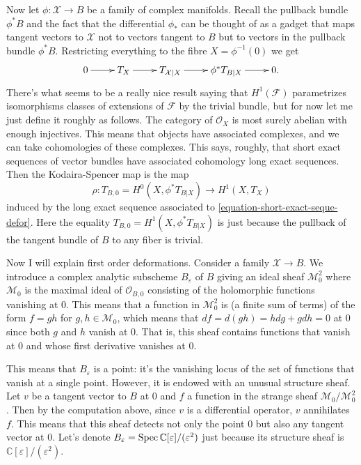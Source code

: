 Now let $\phi:\mathcal{X} \to B$ be a family
of complex manifolds.
Recall the pullback bundle $\phi^*B$ and the
fact
that the differential $\phi_*$ can be thought
of as a gadget
that maps tangent vectors to $\mathcal{X}$
not to vectors tangent to $B$ but
to vectors in the pullback bundle $\phi^*B$.
Restricting everything to the fibre
$X=\phi^{-1}(0)$ we get
\begin{equation}
\label{equation-short-exact-seque-defor}
\xymatrix{
0\ar[r]&T_X\ar[r]&T_{\mathcal{X}|X}\ar[r]&
\phi^*T_{B|X}\ar[r]&0.
}
\end{equation}
There's what seems to be a really nice result
saying that
$H^1(\mathcal{F})$ parametrizes isomorphisms
classes
of extensions of $\mathcal{F}$ by the trivial
bundle,
but for now let me just define it roughly as
follows.
The category of $\mathcal{O}_X$ is most
surely abelian
with enough injectives. This means that
objects
have associated complexes, and we can take
cohomologies of these complexes.
This says, roughly, that short exact
sequences of vector bundles have associated
cohomology
long exact sequences. Then the
Kodaira-Spencer map
is the map
$$
\rho:T_{B,0}=H^0(X,\phi^* T_{B|X})\to
H^1(X,T_X)
$$
induced by the long exact sequence associated
to
\ref{equation-short-exact-seque-defor}.
Here the equality $T_{B,0}=H^1(X,\phi^*
T_{B|X})$
is just because the pullback of the tangent
bundle of $B$
to any fiber is trivial.

\medskip\noindent
Now I will explain first order deformations.
Consider a family $\mathcal{X} \to B$.
We introduce a complex analytic subscheme
$B_\varepsilon$ of $B$
giving an ideal sheaf $\mathcal{M}^2_0$
where $\mathcal{M}_0$ is the maximal ideal
of $\mathcal{O}_{B,0}$ consisting of the
holomorphic
functions vanishing at 0.
This means that a function in
$\mathcal{M}^2_0$
is (a finite sum of terms) of the form $f=gh$
for $g,h \in \mathcal{M}_0$,
which means that $df=d(gh)=hdg+gdh=0$ at $0$
since both $g$ and $h$ vanish at $0$.
That is, this sheaf contains functions that
vanish
at $0$ and whose first derivative vanishes at
$0$.

This means that $B_\varepsilon$ is a point:
it's the vanishing locus of the set of
functions
that vanish at a single point.
However, it is endowed with an unusual
structure sheaf.
Let $v$ be a tangent vector to $B$ at $0$ and
$f$ a function in the strange sheaf
$\mathcal{M}_0/\mathcal{M}_0^2$.
Then by the computation above, since $v$ is a
differential
operator, $v$ annihilates $f$.
This means that this sheaf detects not only
the point $0$
but also any tangent vector at $0$.
Let's denote
$B_\varepsilon=\mathop{\mathrm{Spec}}
\mathbb{C}[\varepsilon]/(\varepsilon^2)$
just because its structure sheaf is
$\mathbb{C}[\varepsilon]/(\varepsilon^2)$.

